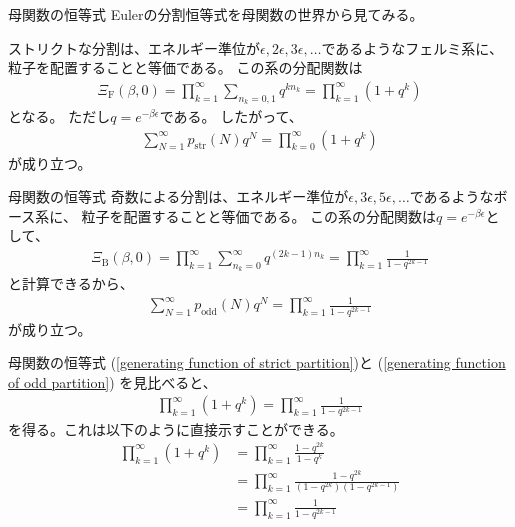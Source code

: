 \documentclass[\main/TL_liquid.tex]{subfiles}
\begin{document}
\begin{frame}{母関数の恒等式}
    Eulerの分割恒等式を母関数の世界から見てみる。

    ストリクトな分割は、エネルギー準位が$\epsilon,2\epsilon,3\epsilon,\ldots$であるようなフェルミ系に、
    粒子を配置することと等価である。
    この系の分配関数は
    \begin{align}
        \Xi_{\mathrm{F}}(\beta,0)
        = \prod_{k=1}^\infty \sum_{n_k = 0,1} q^{kn_k}
        = \prod_{k=1}^\infty (1+q^k)
    \end{align}
    となる。
    ただし$q = e^{-\beta\epsilon}$である。
    したがって、
    \begin{align}
        \sum_{N=1}^\infty p_{\mathrm{str}}(N)q^N
        = \prod_{k=0}^\infty (1+q^k)
        \label{generating function of strict partition}
    \end{align}
    が成り立つ。
\end{frame}

\begin{frame}{母関数の恒等式}
    奇数による分割は、エネルギー準位が$\epsilon,3\epsilon,5\epsilon,\ldots$であるようなボース系に、
    粒子を配置することと等価である。
    この系の分配関数は$q = e^{-\beta\epsilon}$として、
    \begin{align}
        \Xi_{\mathrm{B}}(\beta,0) = \prod_{k=1}^\infty \sum_{n_k=0}^\infty q^{(2k-1)n_k} = \prod_{k=1}^\infty \frac{1}{1-q^{2k-1}}
    \end{align}
    と計算できるから、
    \begin{align}
        \sum_{N=1}^\infty p_{\mathrm{odd}}(N)q^N = \prod_{k=1}^\infty \frac{1}{1-q^{2k-1}}
        \label{generating function of odd partition}
    \end{align}
    が成り立つ。
\end{frame}

\begin{frame}{母関数の恒等式}
    (\ref{generating function of strict partition})と
    (\ref{generating function of odd partition})
    を見比べると、
    \begin{align}
        \prod_{k=1}^\infty (1+q^k)
        =
        \prod_{k=1}^\infty \frac{1}{1-q^{2k-1}}
    \end{align}
    を得る。これは以下のように直接示すことができる。
    \begin{align}
        \prod_{k=1}^\infty (1+q^k)
        & \nonumber
        = \prod_{k=1}^\infty \frac{1-q^{2k}}{1-q^k}
        \\ & \nonumber
        = \prod_{k=1}^\infty \frac{1-q^{2k}}{(1-q^{2k})(1-q^{2k-1})}
        \\ &
        = \prod_{k=1}^\infty \frac{1}{1-q^{2k-1}}
    \end{align}
\end{frame}
\end{document}
